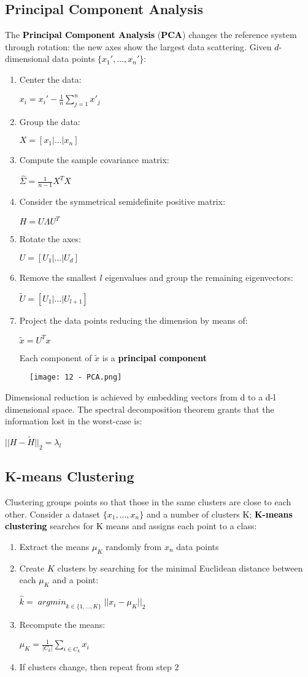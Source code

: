 \documentclass{article}
\DeclareMathOperator*{\argmin}{\textit{argmin}}
\newcommand{\bb}[1]{\textcolor{black}{\textbf{#1}}}
\newcommand{\rr}[1]{\textcolor{black}{#1}}
\newcommand{\cc}[1]{\begin{center}\textcolor{black}{#1}\end{center}}
\begin{document}
\subsection{Principal Component Analysis}
The \bb{Principal Component Analysis} (\bb{PCA}) changes the reference system through rotation: the new axes show the largest data scattering. Given \rr{$d$}-dimensional data points \rr{$\{x_1',\dots,x_n'\}$}:
\begin{enumerate}
    \item Center the data:
        \cc{$x_i = x_i' - \displaystyle\frac{1}{n}\displaystyle\sum_{j=1}^nx'_j$}
    \item Group the data:
        \cc{$X=[x_1|\dots|x_n]$}
    \item Compute the sample covariance matrix:
        \cc{$\hat{\Sigma}=\displaystyle\frac{1}{n-1}X^TX$}
    \item Consider the symmetrical semidefinite positive matrix:
        \cc{$H = U\Lambda U^T$}
    \item Rotate the axes:
        \cc{$U=[U_1|\dots|U_d]$}
    \item Remove the smallest \rr{$l$} eigenvalues and group the remaining eigenvectors:
        \cc{$\tilde{U} = [U_1|\dots|U_{l+1}]$}
    \item Project the data points reducing the dimension by means of:
        \cc{$\tilde{x} = U^Tx$}
        Each component of \rr{$\tilde{x}$} is a \bb{principal component}
\end{enumerate}
\begin{figure}[H]
    \centering
    \texttt{[image: 12 - PCA.png]}
\end{figure}
Dimensional reduction is achieved by embedding vectors from \rr{d} to a \rr{d-l} dimensional space. The spectral decomposition theorem grants that the information lost in the worst-case is:
\cc{$||H-\tilde{H}||_2 = \lambda_l$}

\subsection{K-means Clustering}
Clustering groups points so that those in the same clusters are close to each other. Consider a dataset \rr{$\{x_1, \dots, x_n\}$} and a number of clusters \rr{K}; \bb{K-means clustering} searches for \rr{K} means and assigns each point to a class:
\begin{enumerate}
    \item Extract the means \rr{$\mu_K$} randomly from \rr{$x_n$} data points
    \item Create \rr{$K$} clusters by searching for the minimal Euclidean distance between each \rr{$\mu_K$} and a point:
        \cc{$\hat{k} = \displaystyle\argmin_{k\in\{1,\dots,K\}}||x_i-\mu_K||_2$}
    \item Recompute the means: 
        \cc{$\mu_K=\displaystyle\frac{1}{|C_k|}\displaystyle\sum_{i\in C_k}x_i$}
    \item If clusters change, then repeat from step $2$
\end{enumerate}
\end{document}
